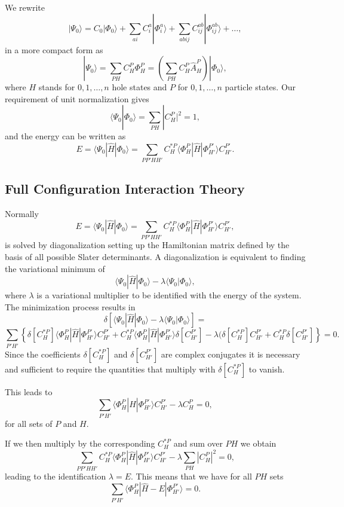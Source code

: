 \documentclass[graybox,sectrefs,envcountresetchap,open=right]{svmonodo}
\begin{document}
We rewrite 
\[
|\Psi_0\rangle=C_0|\Phi_0\rangle+\sum_{ai}C_i^a|\Phi_i^a\rangle+\sum_{abij}C_{ij}^{ab}|\Phi_{ij}^{ab}\rangle+\dots,
\]
in a more compact form as 
\[
|\Psi_0\rangle=\sum_{PH}C_H^P\Phi_H^P=\left(\sum_{PH}C_H^P\hat{A}_H^P\right)|\Phi_0\rangle,
\]
where $H$ stands for $0,1,\dots,n$ hole states and $P$ for $0,1,\dots,n$ particle states. 
Our requirement of unit normalization gives
\[
\langle \Psi_0 | \Phi_0 \rangle = \sum_{PH}|C_H^P|^2= 1,
\]
and the energy can be written as 
\[
E= \langle \Psi_0 | \hat{H} |\Phi_0 \rangle= \sum_{PP'HH'}C_H^{*P}\langle \Phi_H^P | \hat{H} |\Phi_{H'}^{P'} \rangle C_{H'}^{P'}.
\]



\subsection{Full Configuration Interaction Theory}

Normally 
\[
E= \langle \Psi_0 | \hat{H} |\Phi_0 \rangle= \sum_{PP'HH'}C_H^{*P}\langle \Phi_H^P | \hat{H} |\Phi_{H'}^{P'} \rangle C_{H'}^{P'},
\]
is solved by diagonalization setting up the Hamiltonian matrix defined by the basis of all possible Slater determinants. A diagonalization
is equivalent to finding the variational minimum   of 
\[
 \langle \Psi_0 | \hat{H} |\Phi_0 \rangle-\lambda \langle \Psi_0 |\Phi_0 \rangle,
\]
where $\lambda$ is a variational multiplier to be identified with the energy of the system.
The minimization process results in 
\[
\delta\left[ \langle \Psi_0 | \hat{H} |\Phi_0 \rangle-\lambda \langle \Psi_0 |\Phi_0 \rangle\right]=
\]
\[
\sum_{P'H'}\left\{\delta[C_H^{*P}]\langle \Phi_H^P | \hat{H} |\Phi_{H'}^{P'} \rangle C_{H'}^{P'}+
C_H^{*P}\langle \Phi_H^P | \hat{H} |\Phi_{H'}^{P'} \rangle \delta[C_{H'}^{P'}]-
\lambda( \delta[C_H^{*P}]C_{H'}^{P'}+C_H^{*P}\delta[C_{H'}^{P'}]\right\} = 0.
\]
Since the coefficients $\delta[C_H^{*P}]$ and $\delta[C_{H'}^{P'}]$ are complex conjugates it is necessary and sufficient to require the quantities that multiply with $\delta[C_H^{*P}]$ to vanish.  

This leads to 
\[
\sum_{P'H'}\langle \Phi_H^P | \hat{H} |\Phi_{H'}^{P'} \rangle C_{H'}^{P'}-\lambda C_H^{P}=0,
\]
for all sets of $P$ and $H$.

If we then multiply by the corresponding $C_H^{*P}$ and sum over $PH$ we obtain
\[ 
\sum_{PP'HH'}C_H^{*P}\langle \Phi_H^P | \hat{H} |\Phi_{H'}^{P'} \rangle C_{H'}^{P'}-\lambda\sum_{PH}|C_H^P|^2=0,
\]
leading to the identification $\lambda = E$. This means that we have for all $PH$ sets
\begin{equation}
\sum_{P'H'}\langle \Phi_H^P | \hat{H} -E|\Phi_{H'}^{P'} \rangle = 0. \label{eq:fullci}
\end{equation}
\end{document}
